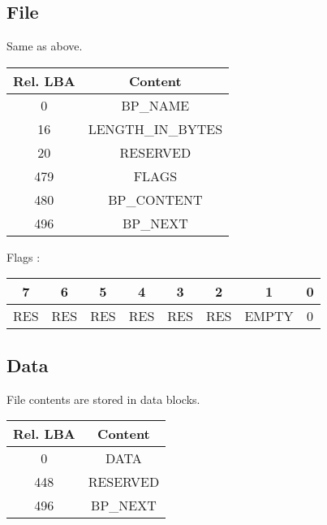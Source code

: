 \documentclass{article}
\begin{document}
\subsection{File}
Same as above.
\newline
\begin{tabular}{|c|c|}
  \hline
  Rel. LBA & Content \\
  \hline
  0 & BP\_NAME \\
  \hline
  16 &  LENGTH\_IN\_BYTES \\
  \hline
  20 &  RESERVED \\
  \hline
  479 &  FLAGS \\
  \hline
  480 & BP\_CONTENT \\
  \hline
  496 & BP\_NEXT \\
  \hline
  
\end{tabular}
\newline
Flags :
\begin{tabular}{|c|c|c|c|c|c|c|c|}
  \hline
  7 & 6 & 5 & 4 & 3 & 2 & 1 & 0 \\
  \hline
  RES & RES & RES & RES & RES & RES & EMPTY & 0  \\
  \hline
\end{tabular}
\subsection{Data}
File contents are stored in data blocks.
\newline
\begin{tabular}{|c|c|}
  \hline
  Rel. LBA & Content \\
  \hline
  0 & DATA \\
  \hline
  448 &  RESERVED \\
  \hline
  496 & BP\_NEXT \\
  \hline
  
\end{tabular}
\end{document}
